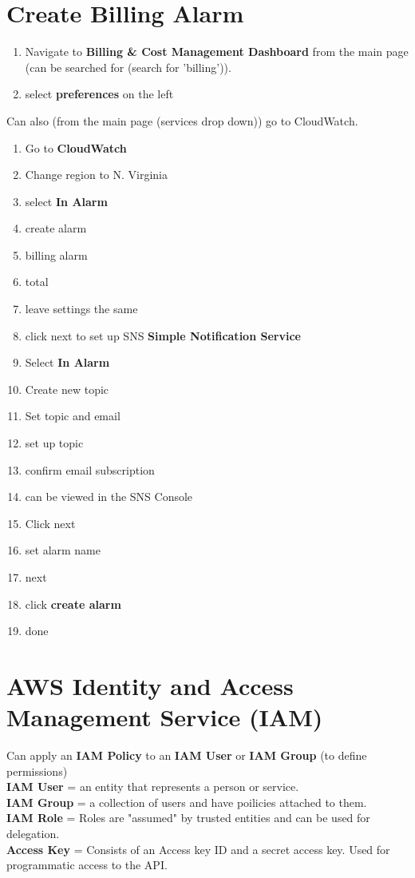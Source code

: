 \documentclass[11pt]{article}
\begin{document}
    \section{Create Billing Alarm}
    \begin{enumerate}
        \item Navigate to \textbf{Billing \& Cost Management Dashboard} from the main page (can be searched for (search for 'billing')).
        \item select \textbf{preferences} on the left
    \end{enumerate}
    Can also (from the main page (services drop down)) go to CloudWatch.
    \\
    \begin{enumerate}
        \item Go to \textbf{CloudWatch}
        \item Change region to N. Virginia
        \item select \textbf{In Alarm}
        \item create alarm
        \item billing alarm
        \item total
        \item leave settings the same
        \item click next to set up SNS \textbf{Simple Notification Service}
        \item Select \textbf{In Alarm}
        \item Create new topic
        \item Set topic and email
        \item set up topic
        \item confirm email subscription
        \item can  be viewed in the SNS Console
        \item Click next
        \item set alarm name
        \item next
        \item click \textbf{create alarm}
        \item done
    \end{enumerate}

    \section{AWS Identity and Access Management Service (IAM)}
    Can apply an \textbf{IAM Policy} to an \textbf{IAM User} or \textbf{IAM Group} (to define permissions)
    \\
    \textbf{IAM User} = an entity that represents a person or service.
    \\
    \textbf{IAM Group} = a collection of users and have poilicies attached to them.
    \\
    \textbf{IAM Role} = Roles are "assumed" by trusted entities and can be used for delegation.
    \\
    \textbf{Access Key} = Consists of an Access key ID and a secret access key.
    Used for programmatic access to the API\@.
\end{document}
